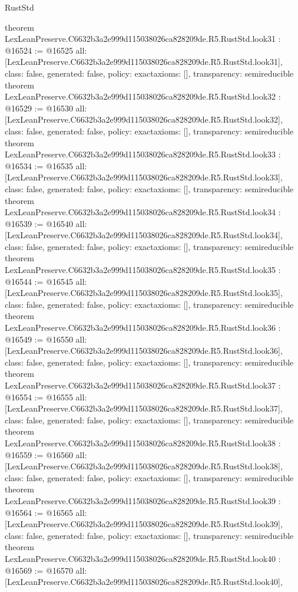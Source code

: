\begin{lexlean}{RustStd}
\begin{coremodule}
{}
theorem LexLeanPreserve.C6632b3a2e999d115038026ca828209de.R5.RustStd.look31 : @16524 := @16525 {
  all: [LexLeanPreserve.C6632b3a2e999d115038026ca828209de.R5.RustStd.look31],
  class: false,
  generated: false,
  policy: exact{axioms: []},
  transparency: semireducible
}
theorem LexLeanPreserve.C6632b3a2e999d115038026ca828209de.R5.RustStd.look32 : @16529 := @16530 {
  all: [LexLeanPreserve.C6632b3a2e999d115038026ca828209de.R5.RustStd.look32],
  class: false,
  generated: false,
  policy: exact{axioms: []},
  transparency: semireducible
}
theorem LexLeanPreserve.C6632b3a2e999d115038026ca828209de.R5.RustStd.look33 : @16534 := @16535 {
  all: [LexLeanPreserve.C6632b3a2e999d115038026ca828209de.R5.RustStd.look33],
  class: false,
  generated: false,
  policy: exact{axioms: []},
  transparency: semireducible
}
theorem LexLeanPreserve.C6632b3a2e999d115038026ca828209de.R5.RustStd.look34 : @16539 := @16540 {
  all: [LexLeanPreserve.C6632b3a2e999d115038026ca828209de.R5.RustStd.look34],
  class: false,
  generated: false,
  policy: exact{axioms: []},
  transparency: semireducible
}
theorem LexLeanPreserve.C6632b3a2e999d115038026ca828209de.R5.RustStd.look35 : @16544 := @16545 {
  all: [LexLeanPreserve.C6632b3a2e999d115038026ca828209de.R5.RustStd.look35],
  class: false,
  generated: false,
  policy: exact{axioms: []},
  transparency: semireducible
}
theorem LexLeanPreserve.C6632b3a2e999d115038026ca828209de.R5.RustStd.look36 : @16549 := @16550 {
  all: [LexLeanPreserve.C6632b3a2e999d115038026ca828209de.R5.RustStd.look36],
  class: false,
  generated: false,
  policy: exact{axioms: []},
  transparency: semireducible
}
theorem LexLeanPreserve.C6632b3a2e999d115038026ca828209de.R5.RustStd.look37 : @16554 := @16555 {
  all: [LexLeanPreserve.C6632b3a2e999d115038026ca828209de.R5.RustStd.look37],
  class: false,
  generated: false,
  policy: exact{axioms: []},
  transparency: semireducible
}
theorem LexLeanPreserve.C6632b3a2e999d115038026ca828209de.R5.RustStd.look38 : @16559 := @16560 {
  all: [LexLeanPreserve.C6632b3a2e999d115038026ca828209de.R5.RustStd.look38],
  class: false,
  generated: false,
  policy: exact{axioms: []},
  transparency: semireducible
}
theorem LexLeanPreserve.C6632b3a2e999d115038026ca828209de.R5.RustStd.look39 : @16564 := @16565 {
  all: [LexLeanPreserve.C6632b3a2e999d115038026ca828209de.R5.RustStd.look39],
  class: false,
  generated: false,
  policy: exact{axioms: []},
  transparency: semireducible
}
theorem LexLeanPreserve.C6632b3a2e999d115038026ca828209de.R5.RustStd.look40 : @16569 := @16570 {
  all: [LexLeanPreserve.C6632b3a2e999d115038026ca828209de.R5.RustStd.look40],
}
\end{coremodule}
\end{lexlean}

